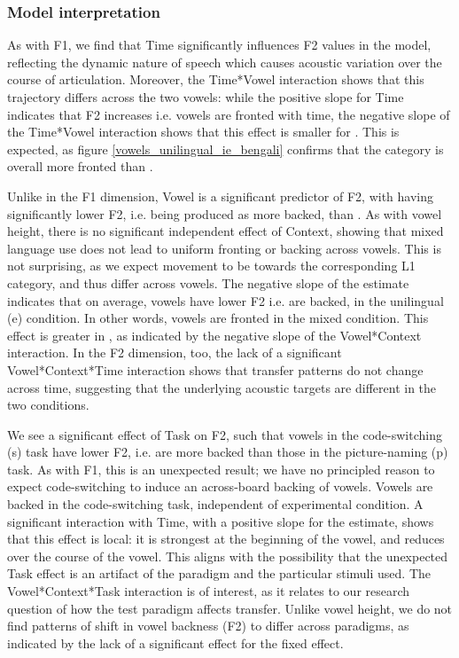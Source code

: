 \documentclass[12 pt]{article}
\newcommand{\nt}[1]{\textipa{[#1]}} %
\begin{document}
\subsubsection*{Model interpretation}

As with F1, we find that Time significantly influences F2 values in the model, reflecting the dynamic nature of speech which causes acoustic variation over the course of articulation. Moreover, the Time*Vowel interaction shows that this trajectory differs across the two vowels: while the positive slope for Time indicates that F2 increases i.e. vowels are fronted with time, the negative slope of the Time*Vowel interaction shows that this effect is smaller for \nt{2}. This is expected, as figure \ref{vowels_unilingual_ie_bengali} confirms that the category \nt{\ae} is overall more fronted than \nt{2}. 

Unlike in the F1 dimension, Vowel is a significant predictor of F2, with \nt{2} having significantly lower F2, i.e. being produced as more backed, than \nt{\ae}. As with vowel height, there is no significant independent effect of Context, showing that mixed language use does not lead to uniform fronting or backing across vowels. This is not surprising, as we expect movement to be towards the corresponding L1 category, and thus differ across vowels. The negative slope of the estimate indicates that on average, vowels have lower F2 i.e. are backed, in the unilingual (e) condition. In other words, vowels are fronted in the mixed condition. This effect is greater in \nt{\ae}, as indicated by the negative slope of the Vowel*Context interaction. In the F2 dimension, too, the lack of a significant Vowel*Context*Time interaction shows that transfer patterns do not change across time, suggesting that the underlying acoustic targets are different in the two conditions.
 
We see a significant effect of Task on F2, such that vowels in the code-switching (s) task have lower F2, i.e. are more backed than those in the picture-naming (p) task. As with F1, this is an unexpected result; we have no principled reason to expect code-switching to induce an across-board backing of vowels. Vowels are backed in the code-switching task, independent of experimental condition. A significant interaction with Time, with a positive slope for the estimate, shows that this effect is local: it is strongest at the beginning of the vowel, and reduces over the course of the vowel. This aligns with the possibility that the unexpected Task effect is an artifact of the paradigm and the particular stimuli used. The Vowel*Context*Task interaction is of interest, as it relates to our research question of how the test paradigm affects transfer. Unlike vowel height, we do not find patterns of shift in vowel backness (F2) to differ across paradigms, as indicated by the lack of a significant effect for the fixed effect. 
\end{document}
